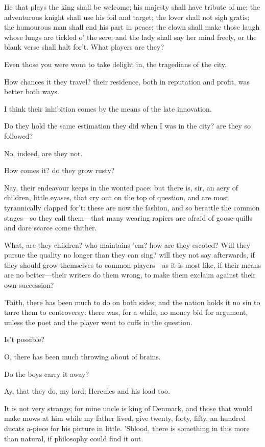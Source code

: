 \documentclass[11pt]{book}
\begin{document}
\1	He that plays the king shall be welcome; his majesty
	shall have tribute of me; the adventurous knight
	shall use his foil and target; the lover shall not
	sigh gratis; the humourous man shall end his part
	in peace; the clown shall make those laugh whose
	lungs are tickled o' the sere; and the lady shall
	say her mind freely, or the blank verse shall halt
	for't. What players are they?

	Even those you were wont to take delight in, the
	tragedians of the city.

\1	How chances it they travel? their residence, both
	in reputation and profit, was better both ways.

 \DriveOut* I think their inhibition comes by the means 
    of the late innovation.  


\1	Do they hold the same estimation they did when I was
	in the city? are they so followed?


	No, indeed, are they not.


\1	How comes it? do they grow rusty?

	Nay, their endeavour keeps in the wonted pace: but
	there is, sir, an aery of children, little eyases,
	that cry out on the top of question, and are most
	tyrannically clapped for't: these are now the
	fashion, and so berattle the common stages---so they
	call them---that many wearing rapiers are afraid of
	goose-quills and dare scarce come thither.

\1	What, are they children? who maintains 'em? how are
	they escoted? Will they pursue the quality no
	longer than they can sing? will they not say
	afterwards, if they should grow themselves to common
	players---as it is most like, if their means are no
	better---their writers do them wrong, to make them
	exclaim against their own succession?

	'Faith, there has been much to do on both sides; and
	the nation holds it no sin to tarre them to
	controversy: there was, for a while, no money bid
	for argument, unless the poet and the player went to
	cuffs in the question.

\1	Is't possible?

	O, there has been much throwing about of brains.

\1	Do the boys carry it away?

	Ay, that they do, my lord; Hercules and his load too.

\1	It is not very strange; for mine uncle is king of
	Denmark, and those that would make mows at him while
	my father lived, give twenty, forty, fifty, an
	hundred ducats a-piece for his picture in little.
	'Sblood, there is something in this more than
	natural, if philosophy could find it out. 
\end{document}
